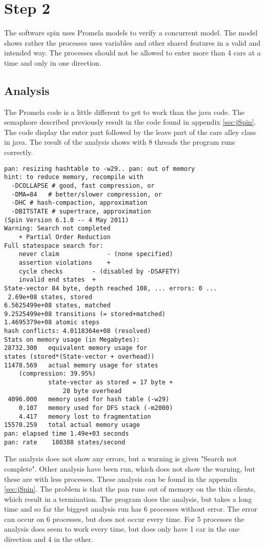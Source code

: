 \section{Step 2}
The software spin uses Promela models to verify a concurrent model. The model shows rather the processes uses variables and other shared features in a valid and intended way. The processes should not be allowed to enter more than 4 cars at a time and only in one direction.
\\

\subsection{Analysis}
The Promela code is a little different to get to work than the java code. The semaphore described previously result in the code found in appendix \ref{sec:jSpin}. The code display the enter part followed by the leave part of the cars alley class in java. The result of the analysis shows with 8 threads the program runs correctly. 

\begin{lstlisting}
pan: resizing hashtable to -w29.. pan: out of memory
hint: to reduce memory, recompile with
  -DCOLLAPSE # good, fast compression, or
  -DMA=84   # better/slower compression, or
  -DHC # hash-compaction, approximation
  -DBITSTATE # supertrace, approximation
(Spin Version 6.1.0 -- 4 May 2011)
Warning: Search not completed
	+ Partial Order Reduction
Full statespace search for:
	never claim         	- (none specified)
	assertion violations	+
	cycle checks       	- (disabled by -DSAFETY)
	invalid end states	+
State-vector 84 byte, depth reached 108, ... errors: 0 ...
 2.69e+08 states, stored
6.5625499e+08 states, matched
9.2525499e+08 transitions (= stored+matched)
1.4695379e+08 atomic steps
hash conflicts: 4.0118364e+08 (resolved)
Stats on memory usage (in Megabytes):
28732.300	equivalent memory usage for 
states (stored*(State-vector + overhead))
11478.569	actual memory usage for states 
    (compression: 39.95%)
         	state-vector as stored = 17 byte + 
         	    28 byte overhead
 4096.000	memory used for hash table (-w29)
    0.107	memory used for DFS stack (-m2000)
    4.417	memory lost to fragmentation
15570.259	total actual memory usage
pan: elapsed time 1.49e+03 seconds
pan: rate    180388 states/second
\end{lstlisting}

The analysis does not show any errors, but a warning is given "Search not complete". Other analysis have been run, which does not show the warning, but these are with less processes. These analysis can be found in the appendix \ref{sec:jSpin}. The problem is that the pan runs out of memory on the thin clients, which result in a termination. The program does the analysis, but takes a long time and so far the biggest analysis run has 6 processes without error. The error can occur on 6 processes, but does not occur every time. For 5 processes the analysis does seem to work every time, but does only have 1 car in the one direction and 4 in the other.


